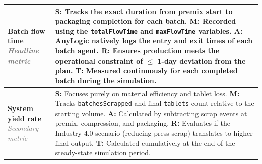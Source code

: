 \begin{table}[H]
\begin{tabularx}{\textwidth}{@{} >{\raggedright\arraybackslash}p{4cm} X @{}}
\textbf{Batch flow time}\newline
\textcolor{gray}{\small \textit{Headline metric}} & 
\textcolor{red!70!black}{\textbf{S:}} Tracks the exact duration from premix start to packaging completion for each batch. \newline
\textcolor{orange!80!black}{\textbf{M:}} Recorded using the \texttt{totalFlowTime} and \texttt{maxFlowTime} variables. \newline
\textcolor{green!60!black}{\textbf{A:}} AnyLogic natively logs the entry and exit times of each batch agent. \newline
\textcolor{blue!70!black}{\textbf{R:}} Ensures production meets the operational constraint of $\le$ 1-day deviation from the plan. \newline
\textcolor{purple!70!black}{\textbf{T:}} Measured continuously for each completed batch during the simulation. \\
\midrule

\textbf{System yield rate}\newline
\textcolor{gray}{\small \textit{Secondary metric}} & 
\textcolor{red!70!black}{\textbf{S:}} Focuses purely on material efficiency and tablet loss. \newline
\textcolor{orange!80!black}{\textbf{M:}} Tracks \texttt{batchesScrapped} and final \texttt{tablets} count relative to the starting volume. \newline
\textcolor{green!60!black}{\textbf{A:}} Calculated by subtracting scrap events at premix, compression, and packaging. \newline
\textcolor{blue!70!black}{\textbf{R:}} Evaluates if the Industry 4.0 scenario (reducing press scrap) translates to higher final output. \newline
\textcolor{purple!70!black}{\textbf{T:}} Calculated cumulatively at the end of the steady-state simulation period. \\

\bottomrule
\end{tabularx}
\end{table}